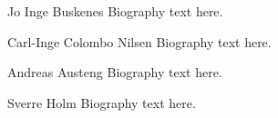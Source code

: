 \documentclass[journal]{IEEEtran}
\begin{document}
\begin{IEEEbiography}{Jo Inge Buskenes}
Biography text here.
\end{IEEEbiography}

\begin{IEEEbiography}{Carl-Inge Colombo Nilsen}
Biography text here.
\end{IEEEbiography}

\newpage

\begin{IEEEbiography}{Andreas Austeng}
Biography text here.
\end{IEEEbiography}

\begin{IEEEbiography}{Sverre Holm}
Biography text here.
\end{IEEEbiography}







\end{document}
